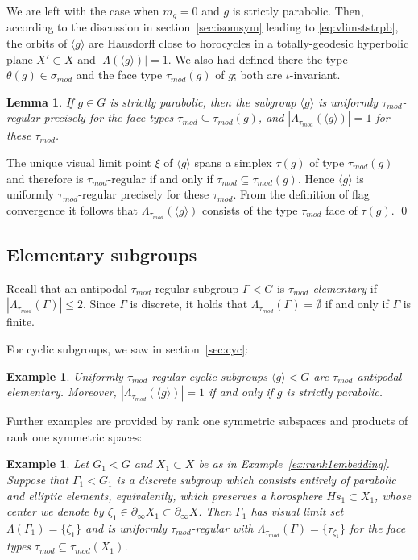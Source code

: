 \documentclass[12pt]{article}
\theoremstyle{boldplain}
\newtheorem{lem}[equation]{Lemma}
\theoremstyle{bolddefinition}
\newtheorem{example}[equation]{Example}
\numberwithin{equation}{section}
\def\Ga{\Gamma}
\def\La{\Lambda}
\def\si{\sigma}
\def\geo{\partial_{\infty}}
\def\LatGa{\Lambda_{\tau_{mod}}(\Gamma)}
\def\Lat{\La_{\tau_{mod}}}
\def\simod{\si_{mod}}
\def\taumod{\tau_{mod}}
\def\<{\langle}
\def\>{\rangle}
\begin{document}
\medskip
We are left with the case when $m_g=0$ and $g$ is strictly parabolic. Then,
according to the discussion in section~\ref{sec:isomsym} leading to \eqref{eq:vlimststrpb},
the orbits of $\<g\>$ are Hausdorff close to horocycles in a totally-geodesic hyperbolic plane $X'\subset X$
and $|\La(\<g\>)|=1.$
We also had defined there  the type $\theta(g)\in \simod$ and the face type 
$\taumod(g)$ of $g$; both are $\iota$-invariant.
\begin{lem}
\label{lem:strpburg}
If $g\in G$ is strictly parabolic, 
then the subgroup $\<g\>$ is uniformly $\taumod$-regular precisely for the face types $\taumod\subseteq\taumod(g)$,
and $|\La_{\taumod}(\<g\>)|=1$ for these $\taumod$.
\end{lem}
\proof
The unique visual limit point $\xi$ of $\<g\>$ spans a simplex $\tau(g)$ of type $\taumod(g)$
and therefore is $\taumod$-regular if and only if $\taumod\subseteq\taumod(g)$.
Hence $\<g\>$ is uniformly $\taumod$-regular precisely for these $\taumod$.
From the definition of flag convergence
it follows that $\La_{\taumod}(\<g\>)$ consists of the type $\taumod$ face of $\tau(g)$.
\qed


\subsection{Elementary subgroups}

Recall that an antipodal $\taumod$-regular subgroup $\Ga<G$ is {\em $\taumod$-elementary} if $|\LatGa|\leq2$. 
Since $\Ga$ is discrete, it holds that $\LatGa=\emptyset$ if and only if $\Ga$ is finite. 

For cyclic subgroups, we saw in section~\ref{sec:cyc}:
\begin{example}
Uniformly $\taumod$-regular cyclic subgroups $\<g\><G$ are $\taumod$-antipodal elementary.
Moreover,
$|\Lat(\<g\>)|=1$ if and only if $g$ is strictly parabolic. 
\end{example}

Further examples are provided by rank one symmetric subspaces and products of rank one symmetric spaces:

\begin{example}\label{ex:elementary2}
Let $G_1<G$ and $X_1\subset X$ be as in Example~\ref{ex:rank1embedding}.
Suppose that $\Ga_1< G_1$ is a discrete subgroup 
which consists entirely of parabolic and elliptic elements, equivalently, which preserves a horosphere 
$Hs_1\subset X_1$,
whose center we denote by $\zeta_1\in\geo X_1\subset\geo X$.
Then $\Ga_1$ has visual limit set $\La(\Ga_1)=\{\zeta_1\}$ 
and is uniformly $\taumod$-regular with $\LatGa=\{\tau_{\zeta_1}\}$ 
for the face types $\taumod\subseteq\taumod(X_1)$. 
\end{example}
\end{document}
